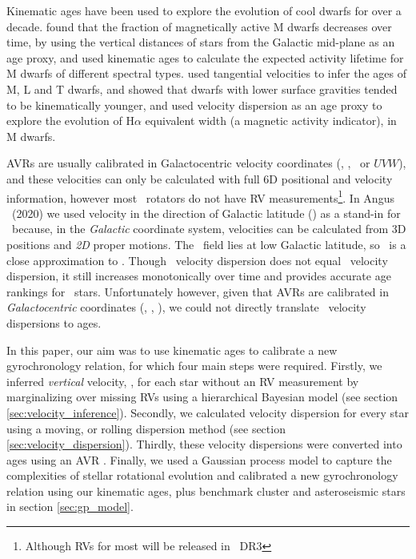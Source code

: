 Kinematic ages have been used to explore the evolution of cool dwarfs for over
a decade.
\citet{west2004, west2006} found that the fraction of magnetically active M
dwarfs decreases over time, by using the vertical distances of stars from the
Galactic mid-plane as an age proxy, and \citet{west2008} used kinematic ages
to calculate the expected activity lifetime for M dwarfs of different spectral
types.
\citet{faherty2009} used tangential velocities to infer the ages of M, L and T
dwarfs, and showed that dwarfs with lower surface gravities tended to be
kinematically younger, and \citet{kiman2019} used velocity dispersion as an
age proxy to explore the evolution of H$\alpha$ equivalent width (a magnetic
activity indicator), in M dwarfs.


AVRs are usually calibrated in Galactocentric velocity coordinates (\vx, \vy,
\vz\ or $UVW$), and these velocities can only be calculated with full 6D
positional and velocity information, however most \kepler\ rotators do not
have RV measurements\footnote{Although RVs for most will be released in \gaia\
DR3}.
In Angus \etal\ (2020) we used velocity in the direction of Galactic latitude
(\vb) as a stand-in for \vz\ because, in the {\it Galactic} coordinate system,
velocities can be calculated from 3D positions and {\it 2D} proper motions.
The \kepler\ field lies at low Galactic latitude, so \vb\ is a close
approximation to \vz.
Though \vb\ velocity dispersion does not equal \vz\ velocity dispersion, it
still increases monotonically over time and provides accurate age rankings for
\kepler\ stars.
Unfortunately however, given that AVRs are calibrated in {\it Galactocentric}
coordinates (\vx, \vy, \vz), we could not directly translate \vb\ velocity
dispersions to ages.

In this paper, our aim was to use kinematic ages to calibrate a new
gyrochronology relation, for which four main steps were required.
Firstly, we inferred {\it vertical} velocity, \vz, for each star without an RV
measurement by marginalizing over missing RVs using a hierarchical Bayesian
model (see section \ref{sec:velocity_inference}).
Secondly, we calculated velocity dispersion for every star using a moving, or
rolling dispersion method (see section \ref{sec:velocity_dispersion}).
Thirdly, these velocity dispersions were converted into ages using an AVR
\citep[][section \ref{sec:avr}]{yu2018}.
Finally, we used a Gaussian process model to capture the complexities of
stellar rotational evolution and calibrated a new gyrochronology relation
using our kinematic ages, plus benchmark cluster and asteroseismic stars in
section \ref{sec:gp_model}.
